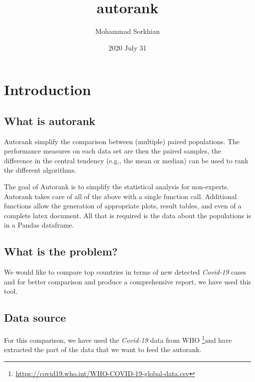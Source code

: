 \documentclass[12pt, letterpaper, twoside]{report}
\title{\textbf{autorank}}
\author{Mohammad Sorkhian}
\date{2020 July 31}
\begin{document}
\maketitle

\chapter{Introduction}
\section{What is \textbf{autorank}}
Autorank simplify the comparison between (multiple) paired populations. 
The performance measures on each data set are then the paired samples, 
the difference in the central tendency (e.g., the mean or median) 
can be used to rank the different algorithms.

The goal of Autorank is to simplify the statistical analysis for non-experts. 
Autorank takes care of all of the above with a single function call. 
Additional functions allow the generation of appropriate plots, result tables, 
and even of a complete latex document. All that is required is the data about 
the populations is in a Pandas dataframe.

\section{What is the problem?}
We would like to compare top countries in terms of new detected \textit{Covid-19} cases and 
for better comparison and produce a comprehensive report, we have used this tool.  

\section{Data source}
For this comparison, we have used the \textit{Covid-19} data from WHO 
\footnote{\url{https://covid19.who.int/WHO-COVID-19-global-data.csv}}and 
have extracted the part of the data that we want to feed the autorank.
\end{document}
